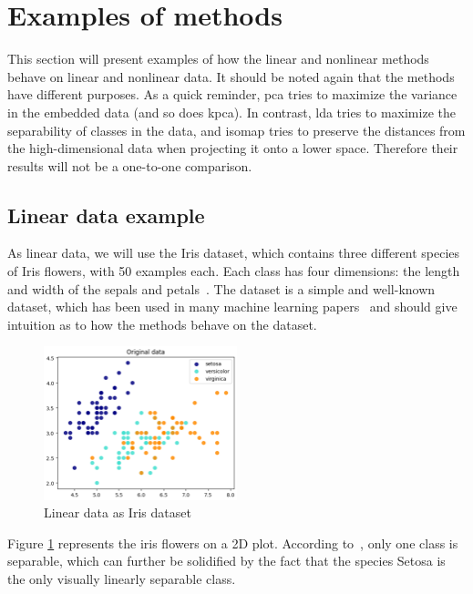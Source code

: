 \section{Examples of methods}\label{sec:examples-methods}
This section will present examples of how the linear and nonlinear methods behave on linear and nonlinear data. It should be noted again that the methods have different purposes. As a quick reminder, \gls{pca} tries to maximize the variance in the embedded data (and so does \gls{kpca}). In contrast, \gls{lda} tries to maximize the separability of classes in the data, and \gls{isomap} tries to preserve the distances from the high-dimensional data when projecting it onto a lower space. Therefore their results will not be a one-to-one comparison.

\subsection{Linear data example}\label{subsec:linear-data-example}
As linear data, we will use the Iris dataset, which contains three different species of Iris flowers, with 50 examples each. Each class has four dimensions: the length and width of the sepals and petals~\cite{iris-dataset}. The dataset is a simple and well-known dataset, which has been used in many machine learning papers~\cite{iris-dataset} and should give intuition as to how the methods behave on the dataset.

\begin{figure}[htb!]
    \centering
    \includegraphics[width=0.5\textwidth]{figures/theory-example-figures/linear-data.png}
    \caption{Linear data as Iris dataset}
    \label{fig:linear-data}
\end{figure}

Figure \ref{fig:linear-data} represents the iris flowers on a 2D plot. According to~\cite{iris-dataset}, only one class is separable, which can further be solidified by the fact that the species Setosa is the only visually linearly separable class.

